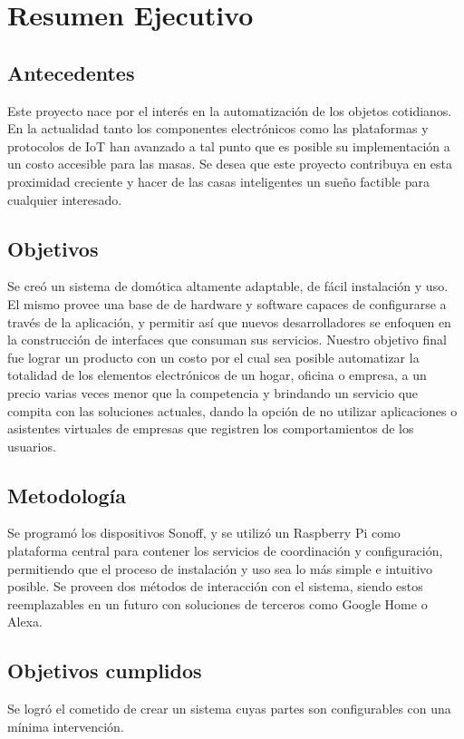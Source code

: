 \chapter{Resumen Ejecutivo}

\section{Antecedentes}

Este proyecto nace por el interés en la automatización de los objetos cotidianos. En la actualidad tanto los componentes electrónicos como las plataformas y protocolos de IoT han avanzado a tal punto que es posible su implementación a un costo accesible para las masas. Se desea que este proyecto contribuya en esta proximidad creciente y hacer de las casas inteligentes un sueño factible para cualquier interesado.

\section{Objetivos}

Se creó un sistema de domótica altamente adaptable, de fácil instalación y uso. El mismo provee una base de de hardware y software capaces de configurarse a través de la aplicación, y permitir así que nuevos desarrolladores se enfoquen en la construcción de interfaces que consuman sus servicios. Nuestro objetivo final fue lograr un producto con un costo por el cual sea posible automatizar la totalidad de los elementos electrónicos de un hogar, oficina o empresa, a un precio varias veces menor que la competencia y brindando un servicio que compita con las soluciones actuales, dando la opción de no utilizar aplicaciones o asistentes virtuales de empresas que registren los comportamientos de los usuarios.

\section{Metodología}

Se programó los dispositivos Sonoff, y se utilizó un Raspberry Pi como plataforma central para contener los servicios de coordinación y configuración, permitiendo que el proceso de instalación y uso sea lo más simple e intuitivo posible. Se proveen dos métodos de interacción con el sistema, siendo estos reemplazables en un futuro con soluciones de terceros como Google Home o Alexa. 

\section{Objetivos cumplidos}

Se logró el cometido de crear un sistema cuyas partes son configurables con una mínima intervención.